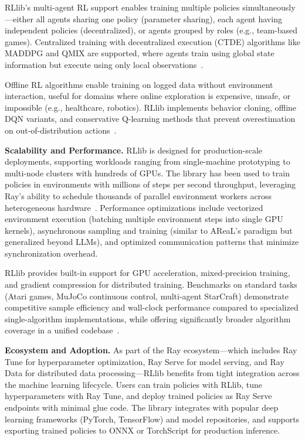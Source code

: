 \documentclass[conference]{IEEEtran}
\begin{document}
RLlib's multi-agent RL support enables training multiple policies simultaneously—either all agents sharing one policy (parameter sharing), each agent having independent policies (decentralized), or agents grouped by roles (e.g., team-based games). Centralized training with decentralized execution (CTDE) algorithms like MADDPG and QMIX are supported, where agents train using global state information but execute using only local observations~\cite{rllib-docs}.

Offline RL algorithms enable training on logged data without environment interaction, useful for domains where online exploration is expensive, unsafe, or impossible (e.g., healthcare, robotics). RLlib implements behavior cloning, offline DQN variants, and conservative Q-learning methods that prevent overestimation on out-of-distribution actions~\cite{rllib-docs}.

\textbf{Scalability and Performance.} RLlib is designed for production-scale deployments, supporting workloads ranging from single-machine prototyping to multi-node clusters with hundreds of GPUs. The library has been used to train policies in environments with millions of steps per second throughput, leveraging Ray's ability to schedule thousands of parallel environment workers across heterogeneous hardware~\cite{rllib-paper}. Performance optimizations include vectorized environment execution (batching multiple environment steps into single GPU kernels), asynchronous sampling and training (similar to AReaL's paradigm but generalized beyond LLMs), and optimized communication patterns that minimize synchronization overhead.

RLlib provides built-in support for GPU acceleration, mixed-precision training, and gradient compression for distributed training. Benchmarks on standard tasks (Atari games, MuJoCo continuous control, multi-agent StarCraft) demonstrate competitive sample efficiency and wall-clock performance compared to specialized single-algorithm implementations, while offering significantly broader algorithm coverage in a unified codebase~\cite{rllib-paper}.

\textbf{Ecosystem and Adoption.} As part of the Ray ecosystem—which includes Ray Tune for hyperparameter optimization, Ray Serve for model serving, and Ray Data for distributed data processing—RLlib benefits from tight integration across the machine learning lifecycle. Users can train policies with RLlib, tune hyperparameters with Ray Tune, and deploy trained policies as Ray Serve endpoints with minimal glue code. The library integrates with popular deep learning frameworks (PyTorch, TensorFlow) and model repositories, and supports exporting trained policies to ONNX or TorchScript for production inference.
\end{document}

